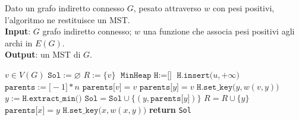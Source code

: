 \documentclass[14pt]{extreport}
\theoremstyle{definition}
\theoremstyle{definition}
\begin{document}
\begin{algorithm}[H]
    \caption{
        Dato un grafo indiretto connesso $G$, pesato attraverso $w$ con pesi positivi, l'algoritmo ne restituisce un MST.\\
        \textbf{Input}: $G$ grafo indiretto connesso; $w$ una funzione che associa pesi positivi agli archi in $E(G)$.\\
        \textbf{Output}: un MST di $G$.
    }

    \begin{algorithmic}[1]
            \State $v \in V(G)$
            \State $\texttt{Sol} := \varnothing$
            \State $R := \{v\}$
            \State $\texttt{MinHeap H} := \texttt{[]}$
                \State $\texttt{H.insert(}u, +\infty\texttt{)}$
            \EndFor
            \State $\texttt{parents} := \texttt{[}-1\texttt{]} * n$
            \State $\texttt{parents[}v\texttt{]} = v$
                \State $\texttt{parents[}y\texttt{]} = v$
                \State $\texttt{H.set\_key(}y, w(v, y)\texttt{)}$
            \EndFor
                \State $y := \texttt{H.extract\_min()}$ 
                    \State $\texttt{Sol} = \texttt{Sol} \cup \{ (y, \texttt{parents[}y\texttt{]}) \}$
                \State $R = R \cup \{y\}$
                        \State $\texttt{parents[}x\texttt{]} = y$
                        \State $\texttt{H.set\_key(}x, w(x, y)\texttt{)}$
                    \EndIf
                \EndFor
            \EndWhile
            \State \textbf{return} \texttt{Sol}
        \EndFunction
    \end{algorithmic}
\end{algorithm}
\end{document}
